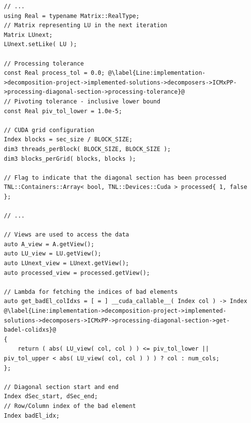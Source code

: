 \begin{lstlisting}[caption={An excerpt from the definition of the overloaded \code{decompose()} method for the ICM\_\textit{x}PP decomposer. The excerpt highlights how the processing of a diagonal section is implemented. For clarity, variables used in the code are declared and documented. The \code{DSecCompute\_kernel()} and \code{DSecAssign\_kernel()} kernels compute and assign values of the diagonal section, respectively. The kernels are presented separately in Listings~\ref{Listing:implementation->decomposition-project->implemented-solutions->decomposers->ICMxPP->kernels->diagonal-compute} and \ref{Listing:implementation->decomposition-project->implemented-solutions->decomposers->ICMxPP->kernels->diagonal-assign}.},label={Listing:implementation->decomposition-project->implemented-solutions->decomposers->ICMxPP->processing-diagonal-section},escapechar=@]
// ...
using Real = typename Matrix::RealType;
// Matrix representing LU in the next iteration
Matrix LUnext;
LUnext.setLike( LU );

// Processing tolerance
const Real process_tol = 0.0; @\label{Line:implementation->decomposition-project->implemented-solutions->decomposers->ICMxPP->processing-diagonal-section->processing-tolerance}@
// Pivoting tolerance - inclusive lower bound
const Real piv_tol_lower = 1.0e-5;

// CUDA grid configuration
Index blocks = sec_size / BLOCK_SIZE;
dim3 threads_perBlock( BLOCK_SIZE, BLOCK_SIZE );
dim3 blocks_perGrid( blocks, blocks );

// Flag to indicate that the diagonal section has been processed
TNL::Containers::Array< bool, TNL::Devices::Cuda > processed{ 1, false };

// ...

// Views are used to access the data
auto A_view = A.getView();
auto LU_view = LU.getView();
auto LUnext_view = LUnext.getView();
auto processed_view = processed.getView();

// Lambda for fetching the indices of bad elements
auto get_badEl_colIdxs = [ = ] __cuda_callable__( Index col ) -> Index @\label{Line:implementation->decomposition-project->implemented-solutions->decomposers->ICMxPP->processing-diagonal-section->get-badel-colidxs}@
{
	return ( abs( LU_view( col, col ) ) <= piv_tol_lower || piv_tol_upper < abs( LU_view( col, col ) ) ) ? col : num_cols;
};

// Diagonal section start and end
Index dSec_start, dSec_end;
// Row/Column index of the bad element
Index badEl_idx;


\end{lstlisting}
